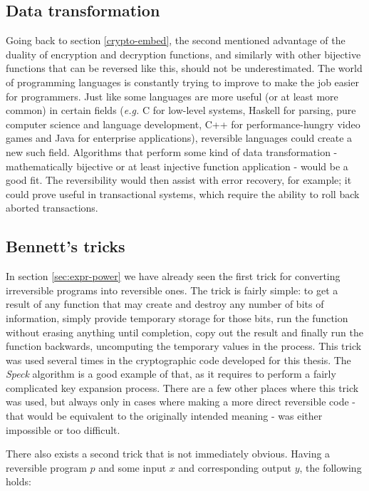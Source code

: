 \documentclass[a4paper,10pt,openright]{memoir}
\newcommand{\eg}{\emph{e.g.}\xspace}
\newcommand{\term}[1]{\textit{#1}}
\begin{document}
\subsection{Data transformation}

Going back to section \ref{crypto-embed}, the second mentioned 
advantage of the duality of encryption and decryption functions, and 
similarly with other bijective functions that can be reversed like 
this, should not be underestimated. The world of programming languages 
is constantly trying to improve to make the job easier for programmers. 
Just like some languages are more useful (or at least more common) in 
certain fields (\eg C for low-level systems, Haskell for parsing, pure 
computer science and language development, C++ for performance-hungry 
video games and Java for enterprise applications), reversible languages 
could create a new such field. Algorithms that perform some kind of 
data transformation - mathematically bijective or at least injective 
function application - would be a good fit. The reversibility would 
then assist with error recovery, for example; it could prove useful in 
transactional systems, which require the ability to roll back aborted 
transactions.

\subsection{Bennett's tricks}

In section \ref{sec:expr-power} we have already seen the first trick 
for converting irreversible programs into reversible ones. The trick is 
fairly simple: to get a result of any function that may create and 
destroy any number of bits of information, simply provide temporary 
storage for those bits, run the function without erasing anything until 
completion, copy out the result and finally run the function backwards, 
uncomputing the temporary values in the process. This trick was used 
several times in the cryptographic code developed for this thesis. The 
\term{Speck} algorithm is a good example of that, as it requires to 
perform a fairly complicated key expansion process. There are a few 
other places where this trick was used, but always only in cases where 
making a more direct reversible code - that would be equivalent to the 
originally intended meaning - was either impossible or too difficult.

There also exists a second trick that is not immediately obvious. Having 
a reversible program $p$ and some input $x$ and corresponding output $y$, the 
following holds:
\end{document}
